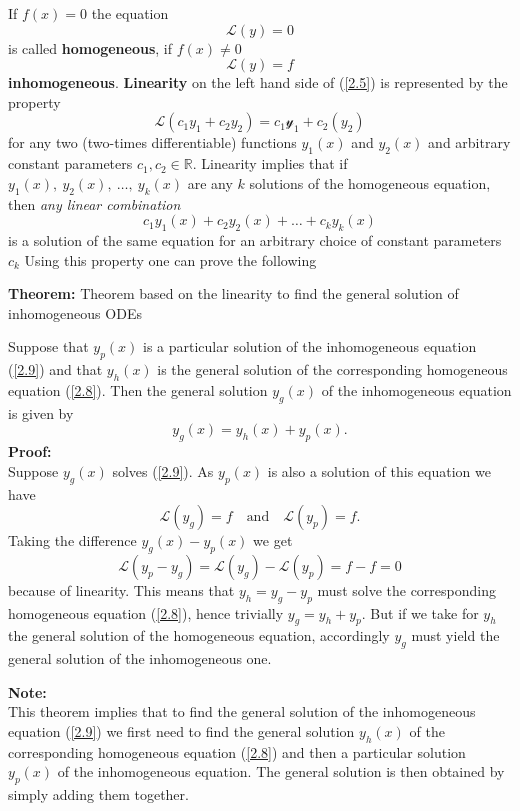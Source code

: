 \documentclass[11pt,a4paper]{article}
\begin{document}
	If $f(x) = 0$ the equation
	\begin{equation}\label{2.8}
		\mathcal{L}(y) = 0
	\end{equation}
	is called \textbf{homogeneous}, if $f(x)\neq 0$
	\begin{equation}\label{2.9}
		\mathcal{L}(y) = f
	\end{equation}
	\textbf{inhomogeneous}. \textbf{Linearity} on the left hand side of (\ref{2.5}) is represented by the property
	\begin{equation}\label{2.10}
		\mathcal{L}(c_1y_1 + c_2y_2) = c_1\mathcal{y_1}+c_2\mathcal{}(y_2)
	\end{equation}
	for any two (two-times differentiable) functions $y_1(x)$ and $y_2(x)$ and arbitrary constant parameters $c_1, c_2 \in \mathbb{R}$. Linearity implies that if $y_1(x),\ y_2(x),\ \ldots,\ y_k(x)$ are any $k$ solutions of the homogeneous equation, then \textit{any linear combination}
	$$
	c_1y_1(x) + c_2y_2(x) + \ldots + c_ky_k(x)
	$$
	is a solution of the same equation for an arbitrary choice of constant parameters $c_k$ Using this property one can prove the following\par
	\textbf{Theorem:} Theorem based on the linearity to find the general solution of inhomogeneous ODEs\par
	Suppose that $y_p(x)$ is a particular solution of the inhomogeneous equation (\ref{2.9}) and that $y_h(x)$ is the general solution of the corresponding homogeneous equation (\ref{2.8}). Then the general solution $y_g(x)$ of the inhomogeneous equation is given by
	\begin{equation}\label{2.11}
		y_g(x) = y_h(x) + y_p(x).
	\end{equation}
	\textbf{Proof:}\\
	Suppose $y_g(x)$ solves (\ref{2.9}). As $y_p(x)$ is also a solution of this equation we have
	$$
	\mathcal{L}(y_g ) = f\quad \text{and}\quad \mathcal{L}(y_p) = f.
	$$
	Taking the difference $y_g(x) − y_p(x)$ we get
	$$
	\mathcal{L}(y_p-y_g) = \mathcal{L}(y_g) - \mathcal{L}(y_p) = f - f = 0
	$$
	because of linearity. This means that $y_h = y_g−y_p$ must solve the corresponding homogeneous equation (\ref{2.8}), hence trivially $y_g = y_h + y_p$. But if we take for $y_h$ the general solution of the homogeneous equation, accordingly $y_g$ must yield the general solution of the inhomogeneous one.\par
	\textbf{Note:}\\
	This theorem implies that to find the general solution of the inhomogeneous equation (\ref{2.9}) we first need to find the general solution $y_h(x)$ of the corresponding homogeneous equation (\ref{2.8}) and then a particular solution $y_p(x)$ of the inhomogeneous equation. The general solution is then obtained by simply adding them together.
\end{document}
